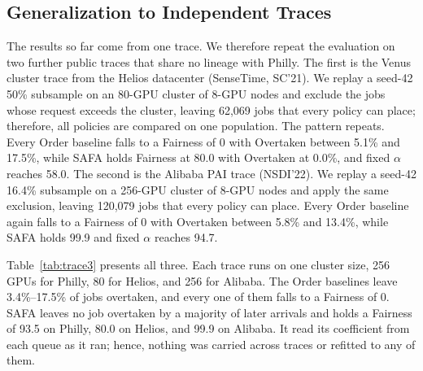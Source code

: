 \documentclass{ieeetj}
\begin{document}
\subsection{Generalization to Independent Traces}\label{eval:robust:trace}
The results so far come from one trace. We therefore repeat the evaluation on two further public traces that share no lineage with Philly. The first is the Venus cluster trace from the Helios\cite{hu2021helios} datacenter (SenseTime, SC'21). We replay a seed-42 50\% subsample on an 80-GPU cluster of 8-GPU nodes and exclude the jobs whose request exceeds the cluster, leaving 62{,}069 jobs that every policy can place; therefore, all policies are compared on one population. The pattern repeats. Every Order baseline falls to a Fairness of 0 with Overtaken between 5.1\% and 17.5\%, while SAFA holds Fairness at 80.0 with Overtaken at 0.0\%, and fixed $\alpha$ reaches 58.0. The second is the Alibaba PAI\cite{weng2022mlaas} trace (NSDI'22). We replay a seed-42 16.4\% subsample on a 256-GPU cluster of 8-GPU nodes and apply the same exclusion, leaving 120{,}079 jobs that every policy can place. Every Order baseline again falls to a Fairness of 0 with Overtaken between 5.8\% and 13.4\%, while SAFA holds 99.9 and fixed $\alpha$ reaches 94.7.

Table~\ref{tab:trace3} presents all three. Each trace runs on one cluster size, 256 GPUs for Philly, 80 for Helios, and 256 for Alibaba. The Order baselines leave 3.4\%--17.5\% of jobs overtaken, and every one of them falls to a Fairness of 0. SAFA leaves no job overtaken by a majority of later arrivals and holds a Fairness of 93.5 on Philly, 80.0 on Helios, and 99.9 on Alibaba. It read its coefficient from each queue as it ran; hence, nothing was carried across traces or refitted to any of them.
\end{document}
